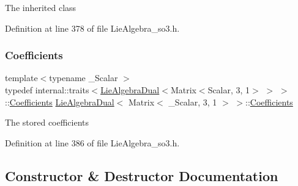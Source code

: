 The inherited class 

Definition at line 378 of file Lie\+Algebra\+\_\+so3.\+h.

\hypertarget{class_lie_algebra_dual_3_01_matrix_3_01___scalar_00_013_00_011_01_4_01_4_ae90a3999d66fafefffe5538cd72985ee}{}\label{class_lie_algebra_dual_3_01_matrix_3_01___scalar_00_013_00_011_01_4_01_4_ae90a3999d66fafefffe5538cd72985ee} 
\subsubsection{\texorpdfstring{Coefficients}{Coefficients}}
{\footnotesize\ttfamily template$<$typename \+\_\+\+Scalar $>$ \\
typedef internal\+::traits$<$\hyperlink{class_lie_algebra_dual}{Lie\+Algebra\+Dual}$<$Matrix$<$Scalar, 3, 1$>$ $>$ $>$\+::\hyperlink{class_lie_algebra_dual_3_01_matrix_3_01___scalar_00_013_00_011_01_4_01_4_ae90a3999d66fafefffe5538cd72985ee}{Coefficients} \hyperlink{class_lie_algebra_dual}{Lie\+Algebra\+Dual}$<$ Matrix$<$ \+\_\+\+Scalar, 3, 1 $>$ $>$\+::\hyperlink{class_lie_algebra_dual_3_01_matrix_3_01___scalar_00_013_00_011_01_4_01_4_ae90a3999d66fafefffe5538cd72985ee}{Coefficients}}

The stored coefficients 

Definition at line 386 of file Lie\+Algebra\+\_\+so3.\+h.



\subsection{Constructor \& Destructor Documentation}
\hypertarget{class_lie_algebra_dual_3_01_matrix_3_01___scalar_00_013_00_011_01_4_01_4_a9fa79ebe0f2e3fecd359e63eeb91671a}{}\label{class_lie_algebra_dual_3_01_matrix_3_01___scalar_00_013_00_011_01_4_01_4_a9fa79ebe0f2e3fecd359e63eeb91671a} 
